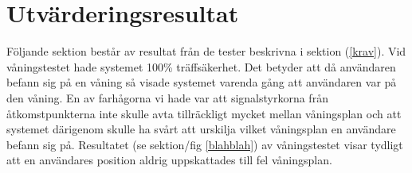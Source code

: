 \documentclass[swedish, a4paper,12pt]{article}
\begin{document}

\section{Utvärderingsresultat}\label{utvarderingsresultat}

Följande sektion består av resultat från de tester beskrivna i sektion (\ref{krav}). Vid våningstestet hade systemet 100\% träffsäkerhet. Det betyder att då användaren befann sig på en våning så visade systemet varenda gång att användaren var på den våning. En av farhågorna vi hade var att signalstyrkorna från åtkomstpunkterna inte skulle avta tillräckligt mycket mellan våningsplan och att systemet därigenom skulle ha svårt att urskilja vilket våningsplan en användare befann sig på. Resultatet (se sektion/fig \ref{blahblah}) av våningstestet visar tydligt att en användares position aldrig uppskattades till fel våningsplan.        %
\end{document}
